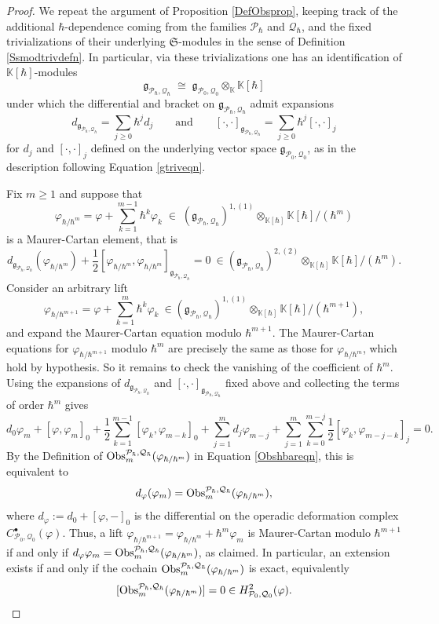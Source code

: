 \documentclass[11pt]{amsart}
\numberwithin{equation}{section}
\theoremstyle{definition}
\newcommand{\bb}{\mathbb}
\newcommand{\mc}{\mathcal}
\newcommand{\mf}{\mathfrak}
\newcommand{\Ph}{{\mathcal{P}_\hbar}}
\newcommand{\Qh}{{\mathcal{Q}_\hbar}}
\newcommand{\gPQh}{{\mathfrak{g}_{\mc P_\hbar,\mc Q_\hbar}}}
\newcommand{\Kh}{{\K[\hbar]}}
\newcommand{\K}{{\bb K}}
\newcommand{\Obs}{{\textup{Obs}}}
\newcommand{\Ss}{{{\mf{S}}}}
\newcommand{\0}{{\textbf{0}}}
\newcommand{\g}{{\mf{g}}}
\def \mf{\mathfrak}
\begin{document}
\begin{proof}
We repeat the argument of Proposition \ref{DefObsprop}, keeping track of the additional $\hbar$-dependence coming from the families $\Ph$ and $\Qh$, and the fixed trivializations of their underlying $\Ss$-modules in the sense of Definition \ref{Ssmodtrivdefn}. In particular, via these trivializations one has an identification of $\Kh$-modules
\[
\gPQh \;\cong\; \g_{\mc P_0,\mc Q_0}\otimes_\K \Kh
\]
under which the differential and bracket on $\gPQh$ admit expansions
\[
d_{\gPQh}=\sum_{j\ge 0}\hbar^j d_j
\qquad\text{and}\qquad
[\cdot,\cdot]_{\gPQh}=\sum_{j\ge 0}\hbar^j[\cdot,\cdot]_j
\]
for $d_j$ and $[\cdot,\cdot]_j$ defined on the underlying vector space $\g_{\mc P_0,\mc Q_0}$, as in the description following Equation \ref{gtriveqn}.

Fix $m\ge 1$ and suppose that
\[
\varphi_{\hbar/\hbar^m}=\varphi+\sum_{k=1}^{m-1}\hbar^k\varphi_k
\;\in\;(\gPQh)^{1,(1)}\otimes_{\Kh}\Kh/(\hbar^m)
\]
is a Maurer-Cartan element, that is
\[
d_{\gPQh}(\varphi_{\hbar/\hbar^m})
+\frac12[\varphi_{\hbar/\hbar^m},\varphi_{\hbar/\hbar^m}]_{\gPQh}= 0 \ \in (\gPQh)^{2,(2)}\otimes_{\Kh}\Kh/(\hbar^{m}).
\]
Consider an arbitrary lift
\[
\varphi_{\hbar/\hbar^{m+1}}
=\varphi+\sum_{k=1}^{m}\hbar^k\varphi_k
\ \in (\gPQh)^{1,(1)}\otimes_{\Kh}\Kh/(\hbar^{m+1}),
\]
and expand the Maurer-Cartan equation modulo $\hbar^{m+1}$. The Maurer-Cartan equations for $\varphi_{\hbar/\hbar^{m+1}}$ modulo $\hbar^m$ are precisely the same as those for $\varphi_{\hbar/\hbar^{m}}$, which hold by hypothesis. So it remains to check the vanishing of the coefficient of $\hbar^m$. Using the expansions of $d_{\gPQh}$ and $[\cdot,\cdot]_{\gPQh}$ fixed above and collecting the terms of order $\hbar^m$ gives
\[
d_0\varphi_m+[\varphi,\varphi_m]_0
+\frac12\sum_{k=1}^{m-1}[\varphi_k,\varphi_{m-k}]_0
+\sum_{j=1}^m d_j\varphi_{m-j}
+\sum_{j=1}^m\sum_{k=0}^{m-j}\frac12[\varphi_k,\varphi_{m-j-k}]_j
=0.
\]
By the Definition of $\Obs_m^{\Ph,\Qh}(\varphi_{\hbar/\hbar^m})$ in Equation \ref{Obshbareqn}, this is equivalent to
\begin{equation}\label{defMChbareqn}
	d_\varphi(\varphi_m)=\Obs_m^{\Ph,\Qh}(\varphi_{\hbar/\hbar^m}),
\end{equation}
where $d_\varphi:=d_0+[\varphi,-]_0$ is the differential on the operadic deformation complex
$C^\bullet_{\mc P_0,\mc Q_0}(\varphi)$. Thus, a lift $\varphi_{\hbar/\hbar^{m+1}}=\varphi_{\hbar/\hbar^m}+\hbar^m\varphi_m$ is Maurer-Cartan
modulo $\hbar^{m+1}$ if and only if $d_\varphi\varphi_m=\Obs_m^{\Ph,\Qh}(\varphi_{\hbar/\hbar^m})$, as claimed. In particular, an extension exists if and only if the cochain
$\Obs_m^{\Ph,\Qh}(\varphi_{\hbar/\hbar^m})$ is exact, equivalently
\[
[\Obs_m^{\Ph,\Qh}(\varphi_{\hbar/\hbar^m})]=0\in H^2_{\mc P_0,\mc Q_0}(\varphi).
\]




\end{proof}
\end{document}
